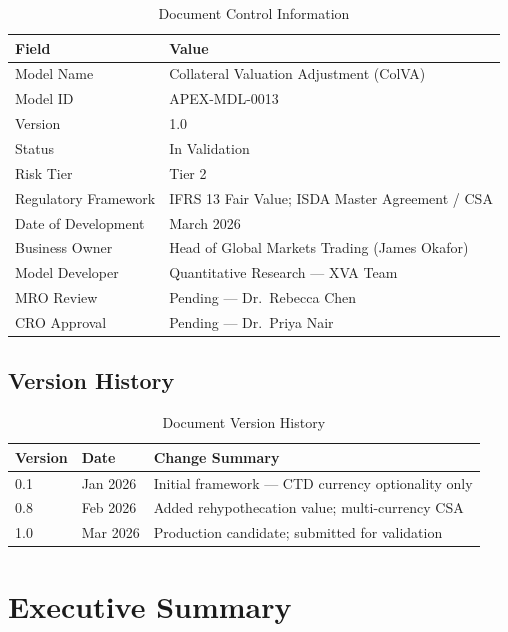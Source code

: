 \documentclass[11pt,a4paper]{article}
\begin{document}
\begin{table}[h!]
\centering
\caption{Document Control Information}
\begin{tabular}{@{}ll@{}}
\toprule
\textbf{Field} & \textbf{Value} \\
\midrule
Model Name            & Collateral Valuation Adjustment (ColVA) \\
Model ID              & APEX-MDL-0013 \\
Version               & 1.0 \\
Status                & In Validation \\
Risk Tier             & Tier 2 \\
Regulatory Framework  & IFRS 13 Fair Value; ISDA Master Agreement / CSA \\
Date of Development   & March 2026 \\
Business Owner        & Head of Global Markets Trading (James Okafor) \\
Model Developer       & Quantitative Research --- XVA Team \\
MRO Review            & Pending --- Dr.\ Rebecca Chen \\
CRO Approval          & Pending --- Dr.\ Priya Nair \\
\bottomrule
\end{tabular}
\end{table}

\subsection{Version History}

\begin{table}[h!]
\centering
\caption{Document Version History}
\begin{tabular}{@{}lll@{}}
\toprule
\textbf{Version} & \textbf{Date} & \textbf{Change Summary} \\
\midrule
0.1 & Jan 2026 & Initial framework --- CTD currency optionality only \\
0.8 & Feb 2026 & Added rehypothecation value; multi-currency CSA \\
1.0 & Mar 2026 & Production candidate; submitted for validation \\
\bottomrule
\end{tabular}
\end{table}

\section{Executive Summary}
\end{document}
